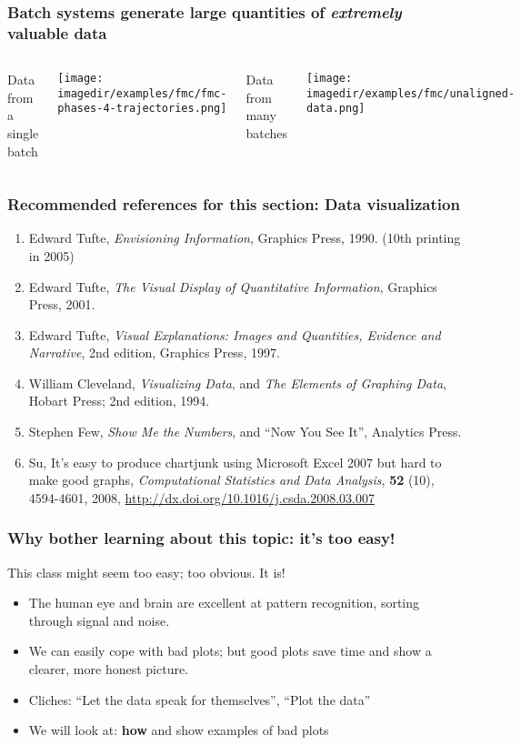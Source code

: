 \begin{frame}\frametitle{Batch systems generate large quantities of \emph{extremely} valuable data}
	\begin{columns}[t]
			Data from a single batch
			\begin{center}
				\texttt{[image: \\imagedir/examples/fmc/fmc-phases-4-trajectories.png]}
			\end{center}
			Data from many batches
			\begin{center}
				\texttt{[image: \\imagedir/examples/fmc/unaligned-data.png]}
			\end{center}
	\end{columns}
\end{frame}

\begin{frame}\frametitle{Recommended references for this section: Data visualization}
	\begin{enumerate}
		\item	Edward Tufte, \emph{Envisioning Information}, Graphics Press, 1990. (10th printing in 2005) 
		\item	Edward Tufte, \emph{The Visual Display of Quantitative Information}, Graphics Press, 2001. 
		\item	Edward Tufte, \emph{Visual Explanations: Images and Quantities, Evidence and Narrative}, 2nd edition, Graphics Press, 1997. 
		\item	William Cleveland, \emph{Visualizing Data}, and \emph{The Elements of Graphing Data}, Hobart Press; 2nd edition, 1994. 
		\item	Stephen Few, \emph{Show Me the Numbers}, and ``Now You See It'', Analytics Press. 
		\item	Su, It's easy to produce chartjunk using Microsoft Excel 2007 but hard to make good graphs, \emph{Computational Statistics and Data Analysis}, \textbf{52} (10), 4594-4601, 2008, \href{http://dx.doi.org/10.1016/j.csda.2008.03.007}{http://dx.doi.org/10.1016/j.csda.2008.03.007} 
	\end{enumerate}
\end{frame}

\begin{frame}\frametitle{Why bother learning about this topic: it's too easy!}
	
	This class might seem too easy; too obvious. It is!
	\begin{itemize}
		\item	The human eye and brain are excellent at pattern recognition, sorting through signal and noise. \pause 
		\item	We can easily cope with bad plots; but good plots save time and show a clearer, more honest picture. 
		\item	Cliches: ``Let the data speak for themselves'', ``Plot the data'' 
		\item	We will look at: \textbf{how} and show examples of bad plots
	\end{itemize}
\end{frame}

